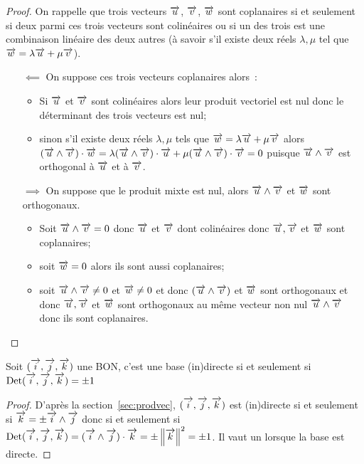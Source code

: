 \begin{proof}
  On rappelle que trois vecteurs \(\vu\), \(\vv\), \(\vw\) sont coplanaires si 
  et seulement si deux parmi ces trois vecteurs sont colinéaires ou si un des 
  trois est une combinaison linéaire des deux autres (à savoir s'il existe 
  deux réels \(\lambda, \mu\) tel que \(\vw = \lambda\vu + \mu\vv\)).
  \begin{itemize}
    \item[\(\impliedby\)] On suppose ces trois vecteurs coplanaires alors~:
      \begin{itemize}
        \item Si \(\vu\) et \(\vv\) sont colinéaires alors leur produit 
          vectoriel est nul donc le déterminant des trois vecteurs est nul;
        \item sinon s'il existe deux réels \(\lambda, \mu\) tels que \(\vw = 
          \lambda\vu + \mu\vv\) alors \((\vu\wedge\vv)\cdot\vw = 
          \lambda(\vu\wedge\vv)\cdot\vu + \mu(\vu\wedge\vv)\cdot\vv = 0\) 
          puisque \(\vu\wedge\vv\) est orthogonal à \(\vu\) et à \(\vv\).
      \end{itemize}
    \item[\(\implies\)] On suppose que le produit mixte est nul, alors 
      \(\vu\wedge\vv\) et \(\vw\) sont orthogonaux.  \begin{itemize}
        \item Soit \(\vu\wedge\vv = 0\) donc \(\vu\) et \(\vv\) dont 
          colinéaires donc \(\vu, \vv\) et \(\vw\) sont coplanaires;
        \item soit \(\vw = 0\) alors ils sont aussi coplanaires;
        \item soit \(\vu\wedge\vv \neq 0\) et \(\vw\neq 0\) et donc 
          \((\vu\wedge\vv)\) et \(\vw\) sont \og orthogonaux \fg{} et donc 
          \(\vu, \vv\) et \(\vw\) sont orthogonaux au même vecteur non nul 
          \(\vu\wedge\vv\) donc ils sont coplanaires.
      \end{itemize}
  \end{itemize}
\end{proof}

\begin{prop}
  Soit \(\bondtrois\) une BON, c'est une base (in)directe si et seulement si 
  \(\Det\bondtrois = \pm 1\)
\end{prop}

\begin{proof}
  D'après la section~\ref{sec:prodvec}, \(\bondtrois\) est (in)directe si et 
  seulement si \(\vk = \pm\vi\wedge\vj\) donc si et seulement si 
  \(\Det\bondtrois = (\vi\wedge\vj)\cdot\vk = \pm\norme{\vk}^2 = \pm 1\). Il 
  vaut un lorsque la base est directe.
\end{proof}

